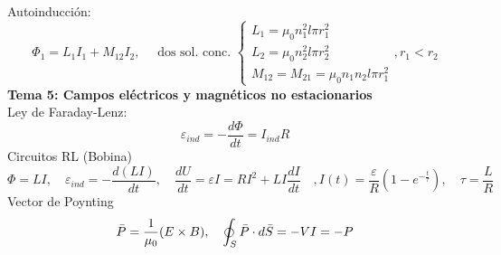 \documentclass{article}
\newcommand{\h}{\hspace{1em}}
\renewcommand{\t}[1]{\text{#1}}
\begin{document}
Autoinducción:
$$
\Phi_1 = L_1 I_1 + M_{12}I_2, \h \t{ dos sol. conc. }\begin{cases}
    L_1 = \mu_0n_1^2l\pi r_1^2 \\
    L_2 = \mu_0n_2^2l\pi r_2^2 \\
    M_{12}=M_{21} = \mu_0n_1n_2l\pi r_1^2
\end{cases}, r_1<r_2
$$
\textbf{Tema 5: Campos eléctricos y magnéticos no estacionarios} \\
Ley de Faraday-Lenz:
$$
\varepsilon_{ind}=-\frac{d\Phi}{dt} = I_{ind}R
$$
Circuitos RL (Bobina)
$$
\Phi = LI, \h \varepsilon_{ind} = - \frac{d(LI)}{dt}, \h \frac{dU}{dt} = \varepsilon I = RI^2 + LI\frac{dI}{dt}  \h, I(t) = \frac{\varepsilon}{R}(1-e^{-\frac{t}{\tau}}), \h \tau = \frac{L}{R}
$$
Vector de Poynting
$$
\Bar{P} = \frac{1}{\mu_0}(E\times B), \h \oint_S \Bar{P}\cdot d\Bar{S} = -VI = -P
$$
\end{document}

